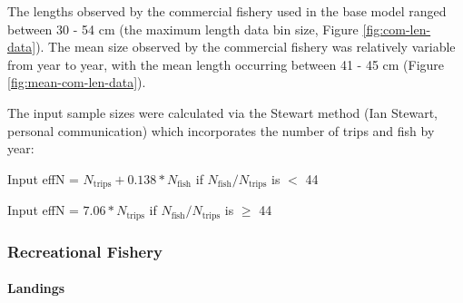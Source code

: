 \documentclass[11pt,
  english,
  a4paper,
]{article}
\begin{document}
\leavevmode\tagmcend\tagstructend\par


The lengths observed by the commercial fishery used in the base model ranged between 30 - 54 cm (the maximum length data bin size, Figure \ref{fig:com-len-data}). The mean size observed by the commercial fishery was relatively variable from year to year, with the mean length occurring between 41 - 45 cm (Figure \ref{fig:mean-com-len-data}).

\leavevmode\tagmcend\tagstructend\par


The input sample sizes were calculated via the Stewart method (Ian Stewart, personal communication) which incorporates the number of trips and fish by year:

\leavevmode\tagmcend\tagstructend\par

\begin{centering}

Input effN = $N_{\text{trips}} + 0.138 * N_{\text{fish}}$ if $N_{\text{fish}}/N_{\text{trips}}$ is $<$ 44

Input effN = $7.06 * N_{\text{trips}}$ if $N_{\text{fish}}/N_{\text{trips}}$ is $\geq$ 44

\end{centering}


\hypertarget{recreational-fishery}{%
\subsubsection{Recreational Fishery}\label{recreational-fishery}}

\leavevmode\tagmcend\tagstructend


\hypertarget{landings-1}{%
\paragraph{Landings}\label{landings-1}}

\leavevmode\tagmcend\tagstructend

\vspace{0.25cm}

\end{document}
